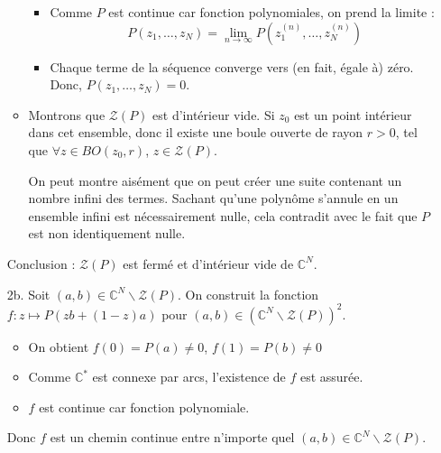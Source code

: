 \begin{solution}
\begin{enumerate}
\begin{itemize}
              \begin{itemize}
                \item Comme $P$ est continue car fonction polynomiales, on prend la limite : 
                  \begin{equation}
                    P(z_1, \dots, z_N) = \underset{n \to \infty}{\lim} P( z_1 ^{(n)}, \dots, z_N ^{(n)})
                  \end{equation}

                \item Chaque terme de la séquence converge vers (en fait, égale à) zéro. Donc, $P(z_1, \dots, z_N) =0$.
              \end{itemize}

            \item Montrons que $\mathcal{Z}(P)$ est d'intérieur vide.
              Si $z_0$ est un point intérieur dans cet ensemble, donc il existe une boule ouverte de rayon $r> 0$, tel que $\forall z \in BO(z_0, r)$, $z \in \mathcal{Z}(P)$. 

              On peut montre aisément que on peut créer une suite contenant un nombre infini des termes. Sachant qu'une polynôme s'annule en un ensemble infini est nécessairement nulle, cela contradit avec le fait que $P$ est non identiquement nulle. 




        \end{itemize}

        Conclusion : $\mathcal{Z}(P)$ est fermé et d'intérieur vide de $\mathbb{C} ^{N}$.

    \item[2b.] Soit $(a,b)\in \mathbb{C} ^{N} \backslash \mathcal{Z}(P)$. On construit la fonction $f: z \mapsto P(zb +(1-z)a)$ pour $(a,b) \in ( \mathbb{C} ^{N } \backslash \mathcal{Z}(P)) ^{2}$. 

    \begin{itemize}

        \item On obtient $f(0) = P(a) \ne 0$, $f(1) = P(b) \ne 0$
        \item Comme $\mathbb{C} ^{*}$ est connexe par arcs, l'existence de $f$ est assurée. 

        \item $f$ est continue car fonction polynomiale.

    \end{itemize}

    Donc $f$ est un chemin continue entre n'importe quel $(a,b) \in \mathbb{C}^{N} \backslash \mathcal{Z}(P)$.


\end{enumerate}
\end{solution}
